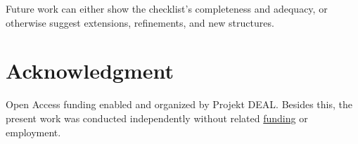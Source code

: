 \documentclass[conference]{IEEEtran}
\begin{document}
Future work can either show the checklist's completeness and adequacy, or otherwise suggest extensions, refinements, and new structures. 



\section*{Acknowledgment}
\label{sec:acknowledgment}

Open Access funding enabled and organized by Projekt DEAL. %
Besides this, the present work was conducted independently without related \href{https://ko-fi.com/michaelhoss}{funding} or employment. 

%
% 
% 
% 
% 
% 


{\small


}
\end{document}
